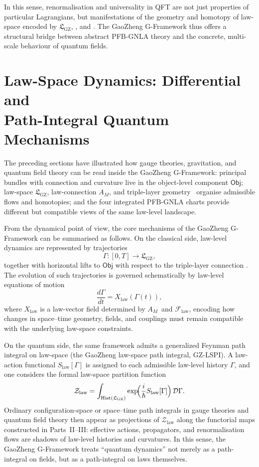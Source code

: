 \documentclass[11pt]{book}
\theoremstyle{plain}
\theoremstyle{definition}
\newcommand{\GZLS}{\ensuremath{\mathfrak{L}_{\mathrm{GZ}}}}       \newcommand{\GZLT}{\ensuremath{M_{!w}}}                           \newcommand{\GZLOC}{\ensuremath{A_M}}                             \newcommand{\GZLCurv}{\ensuremath{\mathcal{F}_{\mathrm{law}}}}
\begin{document}
In this sense, renormalisation and universality in QFT are not just
properties of particular Lagrangians, but manifestations of the
geometry and homotopy of law-space encoded by \GZLS, \GZTLC, and
\GAlgebra. The GaoZheng G-Framework thus offers a structural bridge
between abstract PFB-GNLA theory and the concrete, multi-scale
behaviour of quantum fields.



\section{Law-Space Dynamics: Differential and\texorpdfstring{\\}{ }Path-Integral Quantum Mechanisms}


The preceding sections have illustrated how gauge theories, gravitation,
and quantum field theory can be read inside the GaoZheng G-Framework:
principal bundles with connection and curvature live in the
object-level component $\mathsf{Obj}$; law-space \GZLS, law-connection
\GZLOC, and triple-layer geometry \GZTLC\ organise admissible flows and
homotopies; and the four integrated PFB-GNLA charts provide different
but compatible views of the same law-level landscape.

From the dynamical point of view, the core mechanisms of the
GaoZheng G-Framework can be summarised as follows. On the classical
side, law-level dynamics are represented by trajectories
\[
  \Gamma:[0,T]\to\GZLS,
\]
together with horizontal lifts to $\mathsf{Obj}$ with respect to the
triple-layer connection \GZTLC. The evolution of such trajectories is
governed schematically by law-level equations of motion
\[
  \frac{d\Gamma}{dt} = X_{\mathrm{law}}(\Gamma(t)),
\]
where $X_{\mathrm{law}}$ is a law-vector field determined by
\GZLOC\ and \GZLCurv, encoding how changes in space--time geometry,
fields, and couplings must remain compatible with the underlying
law-space constraints.

On the quantum side, the same framework admits a generalized Feynman
path integral on law-space (the GaoZheng law-space path integral,
GZ-LSPI). A law-action functional $S_{\mathrm{law}}[\Gamma]$ is
assigned to each admissible law-level history $\Gamma$, and one
considers the formal law-space partition function
\[
  \mathcal{Z}_{\mathrm{law}}
  = \int_{\mathrm{Hist}(\GZLS)}
    \exp\!\Bigl(\frac{i}{\hbar}S_{\mathrm{law}}[\Gamma]\Bigr)\,
    \mathcal{D}\Gamma.
\]
Ordinary configuration-space or space--time path integrals in gauge
theories and quantum field theory then appear as projections of
$\mathcal{Z}_{\mathrm{law}}$ along the functorial maps constructed in
Parts~II--III: effective actions, propagators, and renormalisation flows
are shadows of law-level histories and curvatures. In this sense, the
GaoZheng G-Framework treats “quantum dynamics” not merely as a
path-integral on fields, but as a path-integral on laws themselves.
\end{document}
